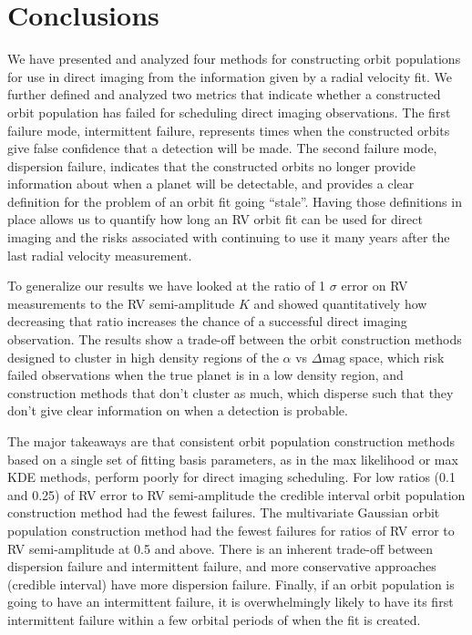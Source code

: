 \section{Conclusions}%
\label{sec:conclusions}
We have presented and analyzed four methods for constructing orbit populations for use in direct imaging
from the information given by a radial velocity fit.  We further defined and analyzed two metrics that
indicate whether a constructed orbit population has failed for scheduling direct imaging observations. The first
failure mode, intermittent failure, represents times when the constructed orbits give false confidence
that a detection will be made. The second failure mode, dispersion failure, indicates that the
constructed orbits no longer provide information about when a planet will be detectable, and provides a 
clear definition for the problem of an orbit fit going ``stale''. Having those definitions in place
allows us to quantify how long an RV orbit fit can be used for direct imaging and the risks associated
with continuing to use it many years after the last radial velocity measurement.

To generalize our results we have looked at the ratio of 1 $\sigma $ error on RV measurements to the
RV semi-amplitude $K$ and showed quantitatively how decreasing that ratio increases the chance  of a
successful direct imaging observation. The results show a trade-off between the orbit construction
methods designed to cluster in high density regions of the $\alpha$ vs $\Delta \textrm{mag}$ space,
which risk failed observations when the true planet is in a low density region, and construction
methods that don't cluster as much, which disperse such that they don't give clear information on
when a detection is probable.

The major takeaways are that consistent orbit population construction methods based on a single set
of fitting basis parameters, as in the max likelihood or max KDE methods, perform poorly for direct
imaging scheduling.  For low ratios (0.1 and 0.25) of RV error to RV semi-amplitude the credible interval orbit
population construction method had the fewest failures.  The multivariate Gaussian orbit population
construction method had the fewest failures for ratios of RV error to RV semi-amplitude at 0.5 and
above.  There is an inherent trade-off between dispersion failure and intermittent failure, and more
conservative approaches (credible interval) have more dispersion failure.  Finally, if an orbit
population is going to have an intermittent failure, it is overwhelmingly likely to have its first
intermittent failure within a few orbital periods of when the fit is created.

